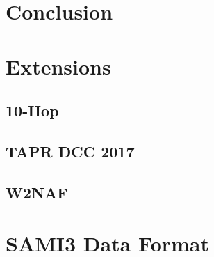 \documentclass[12pt,letterpaper]{article}
\begin{document}
%
%
\section{Conclusion}
\label{sec:conclusion}

%
%
\newpage
\renewcommand{\bibname}{References}



\newpage
\begin{appendices}

  \section{Extensions}
  \label{sec:extensions}

  \subsection{10-Hop}
  \label{sec:extensions:10hop}

  \subsection{TAPR DCC 2017}
  \label{sec:extensions:dcc2017}

  \subsection{W2NAF}
  \label{sec:extensions:w2naf}

  \section{SAMI3 Data Format}
  \label{sec:sami3_df}

\end{appendices}
\end{document}
